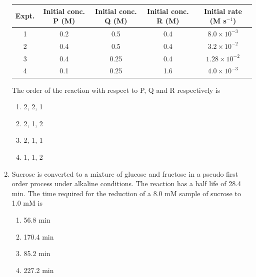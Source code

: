 \documentclass[journal,12pt,onecolumn]{IEEEtran}
\theoremstyle{remark}
\begin{document}
\begin{enumerate}
\begin{center}
\begin{tabular}{|c|c|c|c|c|}
\hline
Expt. & Initial conc. P (M) & Initial conc. Q (M) & Initial conc. R (M) & Initial rate (M s$^{-1}$) \\
\hline
1 & 0.2 & 0.5 & 0.4 & $8.0 \times 10^{-3}$ \\
2 & 0.4 & 0.5 & 0.4 & $3.2 \times 10^{-2}$ \\
3 & 0.4 & 0.25 & 0.4 & $1.28 \times 10^{-2}$ \\
4 & 0.1 & 0.25 & 1.6 & $4.0 \times 10^{-3}$ \\
\hline
\end{tabular}
\end{center}

The order of the reaction with respect to P, Q and R respectively is

\begin{multicols}{2}
\begin{enumerate}
 \item   2, 2, 1
 \item   2, 1, 2
 \item   2, 1, 1
 \item   1, 1, 2
\end{enumerate}
\end{multicols}
  

\item  Sucrose is converted to a mixture of glucose and fructose in a pseudo first order process under alkaline conditions. The reaction has a half life of 28.4 min. The time required for the reduction of a 8.0 mM sample of sucrose to 1.0 mM is \hfill{}

\begin{multicols}{2}
\begin{enumerate}
 \item   56.8 min
 \item   170.4 min
 \item   85.2 min
 \item   227.2 min
\end{enumerate}
\end{multicols}
  


\end{enumerate}
\end{document}
